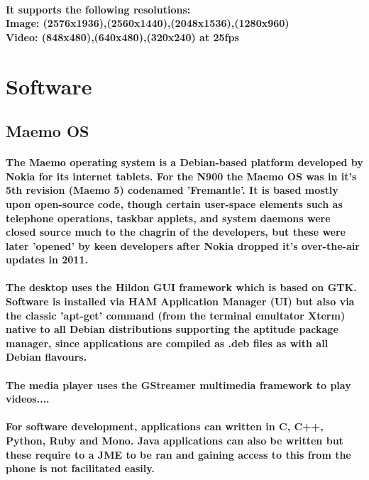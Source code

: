 \documentclass[11pt]{article} %
\begin{document}
\paragraph{ It supports the following resolutions:\\Image: (2576x1936),(2560x1440),(2048x1536),(1280x960)\\Video: (848x480),(640x480),(320x240) at 25fps}

\section{Software}
\subsection{Maemo OS}
\paragraph{The Maemo operating system is a Debian-based platform developed by Nokia for its internet tablets. For the N900 the Maemo OS was in it's 5th revision (Maemo 5) codenamed 'Fremantle'. It is based mostly upon open-source code, though certain user-space elements such as telephone operations, taskbar applets, and system daemons were closed source much to the chagrin of the developers, but these were later 'opened' by keen developers after Nokia dropped it's over-the-air updates in 2011.}
\paragraph{The desktop uses the Hildon GUI framework which is based on GTK. Software is installed via HAM Application Manager (UI) but also via the classic 'apt-get' command (from the terminal emultator Xterm) native to all Debian distributions supporting the aptitude package manager, since applications are compiled as .deb files as with all Debian flavours.}
\paragraph{The media player uses the GStreamer multimedia framework to play videos....}
\paragraph{For software development, applications can written in C, C++, Python, Ruby and Mono. Java applications can also be written but these require to a JME to be ran and gaining access to this from the phone is not facilitated easily.}
\end{document}
